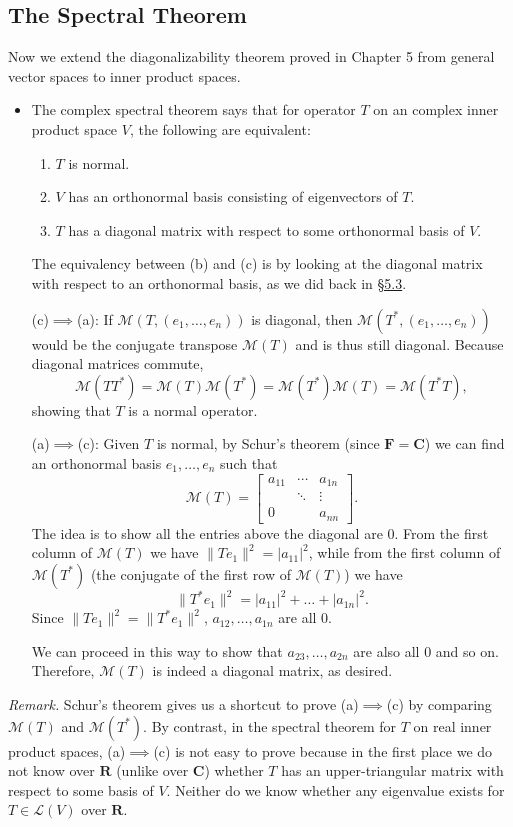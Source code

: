 \documentclass[11pt]{article}
\newcommand{\lk}[2]{\hyperlink{subsection.#1.#2}{\S#1.#2}}
\newcommand{\R}{\mathbf{R}}
\newcommand{\C}{\mathbf{C}}
\newcommand{\F}{\mathbf{F}}
\newcommand{\nm}[1]{\lVert #1 \rVert}
\newcommand{\abs}[1]{\lvert #1 \rvert}
\newcommand{\LV}{\mathcal{L}(V)}
\newcommand{\M}{\mathcal{M}}
\begin{document}
\subsection{The Spectral Theorem}
Now we extend the diagonalizability theorem proved in Chapter 5 from general vector spaces to inner product spaces. 
\begin{itemize}
    \item The complex spectral theorem says that for operator $T$ on an complex inner product space $V$, the following are equivalent:
    \begin{enumerate}[label=(\alph*)]
        \item $T$ is normal.
        \item $V$ has an orthonormal basis consisting of eigenvectors of $T$.
        \item $T$ has a diagonal matrix with respect to some orthonormal basis of $V$.
    \end{enumerate}
    
    The equivalency between (b) and (c) is by looking at the diagonal matrix with respect to an orthonormal basis, as we did back in \lk{5}{3}.
    
    (c)$\implies$(a): If $\M(T,(e_1,\dots,e_n))$ is diagonal, then $\M(T^*,(e_1,\dots,e_n))$ would be the conjugate transpose $\M(T)$ and is thus still diagonal. Because diagonal matrices commute, $$\M(TT^*)=\M(T)\M(T^*)=\M(T^*)\M(T)=\M(T^*T),$$ showing that $T$ is a normal operator.
    
    (a)$\implies$(c): Given $T$ is normal, by Schur's theorem (since $\F = \C$) we can find an orthonormal basis $e_1,\dots,e_n$ such that
    \begin{equation*}
        \M(T)=
        \begin{bmatrix}
            a_{11} & \cdots & a_{1n} \\
            & \ddots & \vdots \\
            0 & & a_{nn}
        \end{bmatrix}.
    \end{equation*}
    The idea is to show all the entries above the diagonal are 0. From the first column of $\M(T)$ we have $\nm{Te_1}^2=\abs{a_{11}}^2$, while from the first column of $\M(T^*)$ (the conjugate of the first row of $\M(T)$) we have $$\nm{T^*e_1}^2=\abs{a_{11}}^2+\dots+\abs{a_{1n}}^2.$$ Since $\nm{Te_1}^2 = \nm{T^*e_1}^2$, $a_{12},\dots,a_{1n}$ are all 0.
    
    We can proceed in this way to show that $a_{23},\dots,a_{2n}$ are also all 0 and so on. Therefore, $\M(T)$ is indeed a diagonal matrix, as desired.
\end{itemize}
\textit{Remark.} Schur's theorem gives us a shortcut to prove (a)$\implies$(c) by comparing $\M(T)$ and $\M(T^*)$. By contrast, in the spectral theorem for $T$ on real inner product spaces, (a)$\implies$(c) is not easy to prove because in the first place we do not know over $\R$ (unlike over $\C$) whether $T$ has an upper-triangular matrix with respect to some basis of $V$. Neither do we know whether any eigenvalue exists for $T \in \LV$ over $\R$.
\end{document}
